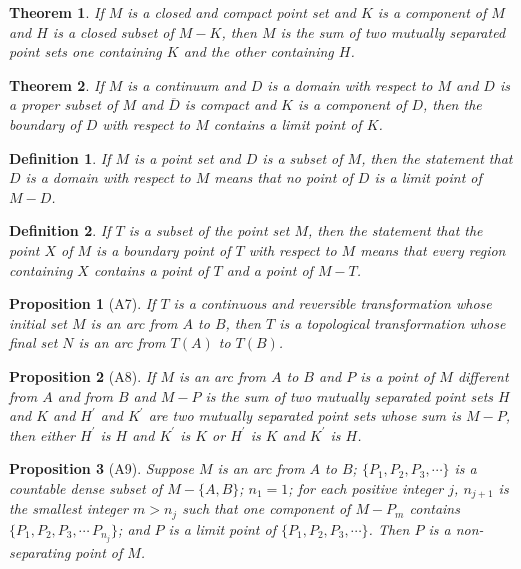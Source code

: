 \documentclass[10pt]{report}
\newtheorem{theorem}{Theorem}
\newtheorem*{proposition}{Proposition}
\newtheorem{definition}{Definition}
\newcommand{\cl}[1]{\overline{#1}}
\begin{document}
\begin{theorem}
 If $M$ is a closed and compact point set and $K$ is a component of $M$ and $H$ is a closed subset of $M-K$, then $M$ is
the sum of two mutually separated point sets one containing $K$ and the other containing $H$.
\end{theorem}

\begin{theorem}
 If $M$ is a continuum and $D$ is a domain with respect to $M$ and $D$ is a proper subset of $M$ and $\cl{D}$ is
compact and $K$ is a component of $D$, then the boundary of $D$ with respect to $M$ contains a limit point of $K$.
\end{theorem}

\begin{definition}
 If $M$ is a point set and $D$ is a subset of $M$, then the statement that $D$ is a domain with respect to $M$ means
that no point of $D$ is a limit point of $M-D$.
\end{definition}

\begin{definition}
 If $T$ is a subset of the point set $M$, then the statement that the point $X$ of $M$ is a boundary point of $T$ with
respect to $M$ means that every region containing $X$ contains a point of $T$ and a point of $M-T$.
\end{definition}

\begin{proposition}[A7]
 If $T$ is a continuous and reversible transformation whose initial set $M$ is an arc from $A$ to $B$, then $T$ is a
topological transformation whose final set $N$ is an arc from $T(A)$ to $T(B)$.
\end{proposition}

\begin{proposition}[A8]
 If $M$ is an arc from $A$ to $B$ and $P$ is a point of $M$ different from $A$ and from $B$ and $M-P$ is the sum of two
mutually separated point sets $H$ and $K$ and $H^\prime$ and $K^\prime$ are two mutually separated point sets whose sum
is $M-P$, then either $H^\prime$ is $H$ and $K^\prime$ is $K$ or $H^\prime$ is $K$ and $K^\prime$ is $H$.
\end{proposition}

\begin{proposition}[A9]
 Suppose $M$ is an arc from $A$ to $B$; $\{P_1,P_2,P_3,\cdots\}$ is a countable dense subset of $M-\{A,B\}$; $n_1=1$;
for each positive integer $j$, $n_{j+1}$ is the smallest integer $m>n_j$ such that one component of $M-P_m$ contains
$\{P_1,P_2,P_3,\cdots\,P_{n_j}\}$; and $P$ is a limit point of $\{P_1,P_2,P_3,\cdots\}$. Then $P$ is a non-separating
point of $M$.
\end{proposition}
\end{document}
